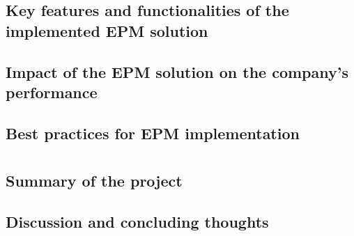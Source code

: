 \documentclass[12pt,a4paper,openright,twoside]{book}
\begin{document}
\section{Key features and functionalities of the implemented EPM solution}

\section{Impact of the EPM solution on the company's performance}

\section{Best practices for EPM implementation}

\chapter{\conclusionsname}
\label{chap:conclusions}

\section{Summary of the project}

\section{Discussion and concluding thoughts}



\nocite{*} %


\end{document}

